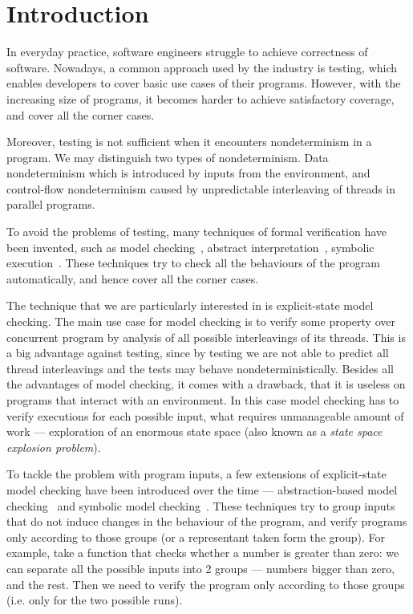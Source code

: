 \chapter{Introduction}\label{ch:Introduction}


\noindent

In everyday practice, software engineers struggle to achieve correctness of
software. Nowadays, a common approach used by the industry is testing, which
enables developers to cover basic use cases of their programs. However, with the
increasing size of programs, it becomes harder to achieve satisfactory
coverage, and cover all the corner cases.

Moreover, testing is not sufficient when it encounters nondeterminism in a
program. We may distinguish two types of nondeterminism. Data nondeterminism
which is introduced by inputs from the environment, and control-flow
nondeterminism caused by unpredictable interleaving of threads in parallel
programs.

To avoid the problems of testing, many techniques of formal verification have
been invented, such as model checking~\cite{Baier08}, abstract
interpretation~\cite{Cousot14}, symbolic execution~\cite{King76}. These
techniques try to check all the behaviours of the program automatically, and
hence cover all the corner cases.

The technique that we are particularly interested in is explicit-state model
checking. The main use case for model checking is to verify some
property over concurrent program by analysis of all possible
interleavings of its threads. This is a big advantage against testing, since
by testing we are not able to predict all thread interleavings and the tests may
behave nondeterministically. Besides all the advantages of model checking, it
comes with a drawback, that it is useless on programs that interact with an
environment. In this case model checking has to verify executions for each
possible input, what requires unmanageable amount of work --- exploration of an
enormous state space (also known as a \emph{state space explosion problem}).

To tackle the problem with program inputs, a few extensions of explicit-state
model checking have been introduced over the time --- abstraction-based model
checking~\cite{Clarke94} and symbolic model checking~\cite{Clarke96}. These
techniques try to group inputs that do not induce changes in the behaviour of the
program, and verify programs only according to those groups (or a representant
taken form the group). For example, take a function that checks whether a
number is greater than zero: we can separate all the possible inputs into 2 groups --- numbers
bigger than zero, and the rest. Then we need to verify
the program only according to those groups (i.e. only for the two possible runs).

